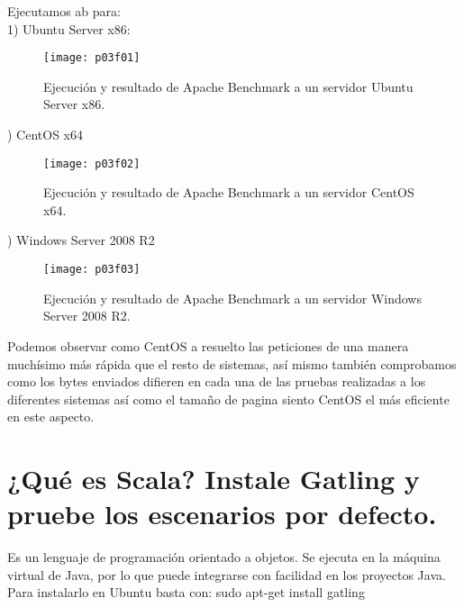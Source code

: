 Ejecutamos ab para:\\

1) Ubuntu Server x86:
\begin{figure}[H]
	\centering
	\texttt{[image: p03f01]}
	\caption{Ejecución y resultado de Apache Benchmark a un servidor Ubuntu Server x86.}
	\label{fig:p03f01}
\end{figure}

) CentOS x64
\begin{figure}[H]
	\centering
	\texttt{[image: p03f02]}
	\caption{Ejecución y resultado de Apache Benchmark a un servidor CentOS x64.}
	\label{fig:p03f02}
\end{figure}

) Windows Server 2008 R2
\begin{figure}[H]
	\centering
	\texttt{[image: p03f03]}
	\caption{Ejecución y resultado de Apache Benchmark a un servidor Windows Server 2008 R2.}
	\label{fig:p03f03}
\end{figure}



Podemos observar como CentOS a resuelto las peticiones de una manera muchísimo más rápida que el resto de sistemas, así mismo también comprobamos como los bytes enviados difieren en cada una de las pruebas realizadas a los diferentes sistemas así como el tamaño de pagina siento CentOS el más eficiente en este aspecto.\\



\section{¿Qué es Scala? Instale Gatling y pruebe los escenarios por defecto. \cite{c02o}}

Es un lenguaje de programación orientado a objetos. Se ejecuta en la máquina virtual de Java, por lo que puede integrarse con facilidad en los proyectos Java.\\

Para instalarlo en Ubuntu basta con: sudo apt-get install gatling\\






